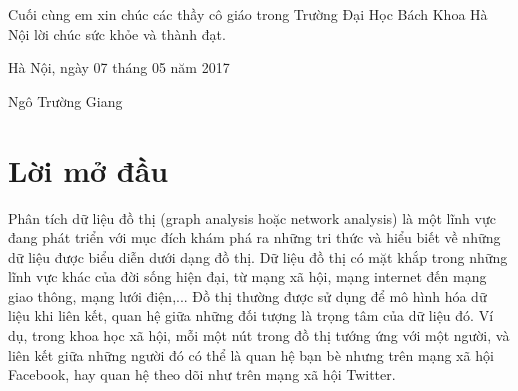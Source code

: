 \documentclass[14pt, oneside, a4paper, openany]{scrartcl}
\begin{document}
Cuối cùng em xin chúc các thầy cô giáo trong Trường Đại Học Bách Khoa Hà Nội lời chúc sức khỏe và thành đạt.

\begin{flushright}
	Hà Nội, ngày 07 tháng 05 năm 2017
\end{flushright}
\hspace{95 mm}Ngô Trường Giang

\newpage
\section{Lời mở đầu}
Phân tích dữ liệu đồ thị (graph analysis hoặc network analysis) là một lĩnh vực đang phát triển với mục đích khám phá ra những tri thức và hiểu biết về những dữ liệu được biểu diễn dưới dạng đồ thị.
Dữ liệu đồ thị có mặt khắp trong những lĩnh vực khác của đời sống hiện đại, từ mạng xã hội, mạng internet đến mạng giao thông, mạng lưới điện,...
Đồ thị thường được sử dụng để mô hình hóa dữ liệu khi liên kết, quan hệ giữa những đối tượng là trọng tâm của dữ liệu đó.
Ví dụ, trong khoa học xã hội, mỗi một nút trong đồ thị tướng ứng với một người, và liên kết giữa những người đó có thể là quan hệ bạn bè nhưng trên mạng xã hội Facebook, hay quan hệ theo dõi như trên mạng xã hội Twitter.
\end{document}
